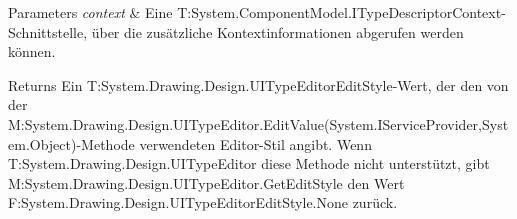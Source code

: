 \begin{DoxyParams}{Parameters}
{\em context} & Eine T\-:\-System.\-Component\-Model.\-I\-Type\-Descriptor\-Context-\/\-Schnittstelle, über die zusätzliche Kontextinformationen abgerufen werden können.\\
\hline
\end{DoxyParams}
\begin{DoxyReturn}{Returns}
Ein T\-:\-System.\-Drawing.\-Design.\-U\-I\-Type\-Editor\-Edit\-Style-\/\-Wert, der den von der M\-:\-System.\-Drawing.\-Design.\-U\-I\-Type\-Editor.\-Edit\-Value(\-System.\-I\-Service\-Provider,\-System.\-Object)-\/\-Methode verwendeten Editor-\/\-Stil angibt. Wenn T\-:\-System.\-Drawing.\-Design.\-U\-I\-Type\-Editor diese Methode nicht unterstützt, gibt M\-:\-System.\-Drawing.\-Design.\-U\-I\-Type\-Editor.\-Get\-Edit\-Style den Wert F\-:\-System.\-Drawing.\-Design.\-U\-I\-Type\-Editor\-Edit\-Style.\-None zurück. 
\end{DoxyReturn}
